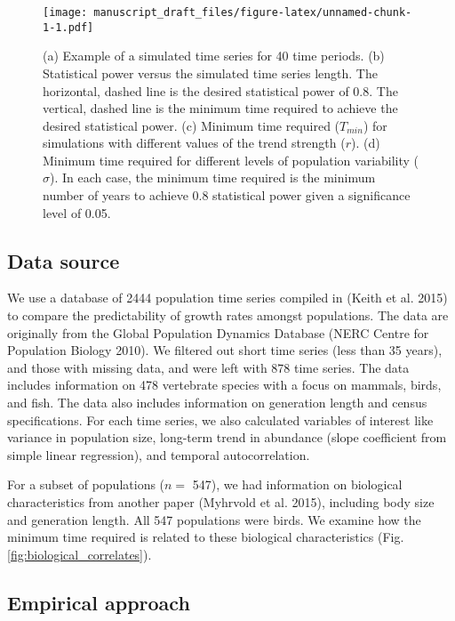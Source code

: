 \documentclass[12pt,]{article}
\begin{document}
\begin{figure}[htbp]
\centering
\texttt{[image: manuscript\_draft\_files/figure-latex/unnamed-chunk-1-1.pdf]}
\caption{(a) Example of a simulated time series for 40 time periods. (b)
Statistical power versus the simulated time series length. The
horizontal, dashed line is the desired statistical power of 0.8. The
vertical, dashed line is the minimum time required to achieve the
desired statistical power. (c) Minimum time required (\(T_{min}\)) for
simulations with different values of the trend strength (\(r\)). (d)
Minimum time required for different levels of population variability
(\(\sigma\)). In each case, the minimum time required is the minimum
number of years to achieve 0.8 statistical power given a significance
level of 0.05.\label{fig:theoretical_approach}}
\end{figure}

\subsection{Data source}\label{data-source}

We use a database of 2444 population time series compiled in (Keith et
al. 2015) to compare the predictability of growth rates amongst
populations. The data are originally from the Global Population Dynamics
Database (NERC Centre for Population Biology 2010). We filtered out
short time series (less than 35 years), and those with missing data, and
were left with 878 time series. The data includes information on 478
vertebrate species with a focus on mammals, birds, and fish. The data
also includes information on generation length and census
specifications. For each time series, we also calculated variables of
interest like variance in population size, long-term trend in abundance
(slope coefficient from simple linear regression), and temporal
autocorrelation.

For a subset of populations (\(n =\) 547), we had information on
biological characteristics from another paper (Myhrvold et al. 2015),
including body size and generation length. All 547 populations were
birds. We examine how the minimum time required is related to these
biological characteristics (Fig. \ref{fig:biological_correlates}).

\subsection{Empirical approach}\label{empirical-approach}
\end{document}

